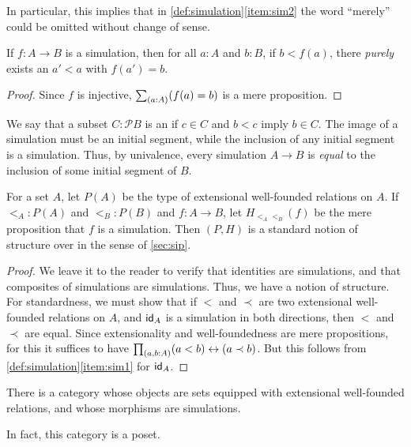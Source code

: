 In particular, this implies that in \autoref{def:simulation}\ref{item:sim2} the word ``merely'' could be omitted without change of sense.

\begin{cor}
  If $f:A\to B$ is a simulation, then for all $a:A$ and $b:B$, if $b<f(a)$, there \emph{purely} exists an $a'<a$ with $f(a')=b$.
\end{cor}
\begin{proof}
  Since $f$ is injective, $\sm{a:A} (f(a)=b)$ is a mere proposition.
\end{proof}

We say that a subset $C :\mathcal{P}B$ is an  if $c\in C$ and $b<c$ imply $b\in C$.
The image of a simulation must be an initial segment, while the inclusion of any initial segment is a simulation.
Thus, by univalence, every simulation $A\to B$ is \emph{equal} to the inclusion of some initial segment of $B$.

\begin{thm}
  For a set $A$, let $P(A)$ be the type of extensional well-founded relations on $A$.
  If $\mathord{<_A} : P(A)$ and $\mathord{<_B} : P(B)$ and $f:A\to B$, let $H_{\mathord{<_A}\mathord{<_B}}(f)$ be the mere proposition that $f$ is a simulation.
  Then $(P,H)$ is a standard notion of structure over \uset in the sense of \autoref{sec:sip}.
\end{thm}
\begin{proof}
  We leave it to the reader to verify that identities are simulations, and that composites of simulations are simulations.
  Thus, we have a notion of structure.
  For standardness, we must show that if $<$ and $\prec$ are two extensional well-founded relations on $A$, and $\idfunc[A]$ is a simulation in both directions, then $<$ and $\prec$ are equal.
  Since extensionality and well-foundedness are mere propositions, for this it suffices to have $\prd{a,b:A} (a<b) \leftrightarrow (a\prec b)$.
  But this follows from \autoref{def:simulation}\ref{item:sim1} for $\idfunc[A]$.
\end{proof}

\begin{cor}\label{thm:wfcat}
  There is a category whose objects are sets equipped with extensional well-founded relations, and whose morphisms are simulations.
\end{cor}

In fact, this category is a poset.

